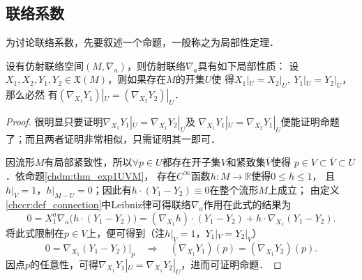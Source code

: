 \subsection{联络系数}
为讨论联络系数，先要叙述一个命题，一般称之为{\heiti 局部性定理}．  
\begin{proposition}\label{chccr:thm_local}
    设有仿射联络空间$(M,\nabla_a)$，则仿射联络$\nabla_a$具有如下{\kaishu 局部性质}：
    设$X_1,X_2,Y_1,Y_2\in \mathfrak{X}(M)$，则如果存在$M$的开集$U$使
    得$X_1|_U =X_2|_U,\ Y_1|_U =Y_2|_U  $，那么必然
    有$(\nabla_{X_1} Y_1) |_U=(\nabla_{X_2} Y_2) |_U$．
\end{proposition}
\begin{proof}
    很明显只要证明$\nabla_{X_1} Y_1 |_U=\nabla_{X_1} Y_2 |_U$及
    $\nabla_{X_1} Y_1 |_U=\nabla_{X_2} Y_1 |_U$便能证明命题了；而且两者证明非常相似，只需证明其一即可．

    因流形$M$有局部紧致性，所以$\forall p\in U$都存在开子集$V$和紧致集$\overline{V}$使得
    $p \in V \subset \overline{V} \subset U$．依命题\ref{chdm:thm_exp1UVM}，
    存在$C^\infty$函数$h:M \to \mathbb{R}$使得$0\leqslant h \leqslant 1$，
    且$h|_V=1$，$h|_{M-U}=0$；因此有$h\cdot(Y_1-Y_2)\equiv 0$在整个流形$M$上成立；
    由定义\ref{chccr:def_connection}中Leibniz律可得联络$\nabla_a$作用在此式的结果为
    \begin{equation*}
        0=X_1^a \nabla_a \bigl( h\cdot(Y_1-Y_2) \bigr) = ( \nabla_{X_1}  h ) \cdot(Y_1-Y_2)
        +h\cdot \nabla_{X_1} (Y_1-Y_2) .
    \end{equation*}
    将此式限制在$p\in V$上，便可得到（注$h|_V=1$，$Y_1|_V =Y_2|_V$）
    \begin{equation*}
        0=\nabla_{X_1} (Y_1-Y_2)|_p 
        \quad \Rightarrow \quad
        (\nabla_{X_1} Y_1) (p) = (\nabla_{X_1} Y_2) (p) .
    \end{equation*}
    因点$p$的任意性，可得$\nabla_{X_1} Y_1|_U = \nabla_{X_1} Y_2|_U$，进而可证明命题．
\end{proof}




